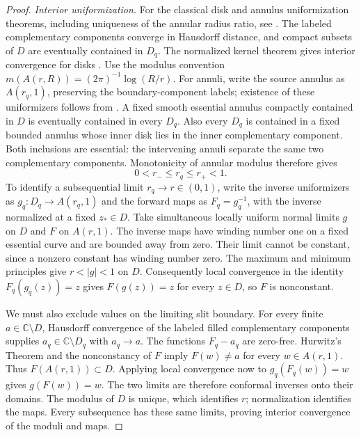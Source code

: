\documentclass[11pt]{article}
\theoremstyle{definition}
\theoremstyle{remark}
\numberwithin{equation}{section}
\begin{document}
\begin{proof}
\emph{Interior uniformization.}
For the classical disk and annulus uniformization theorems, including
uniqueness of the annular radius ratio, see
\cite[Theorems~1.2.1 and~1.3.1]{Papamichael2008}.
The labeled complementary components converge in Hausdorff distance,
and compact subsets of $D$ are eventually contained in $D_q$.
The normalized kernel theorem gives interior convergence for disks
\cite[Definition~2.8 and Theorem~2.9]{CarmonaFedorovskiy2024}.
Use the modulus convention $m(A(r,R))=(2\pi)^{-1}\log(R/r)$.
For annuli, write the source annulus as $A(r_q,1)$, preserving the
boundary-component labels; existence of these uniformizers follows
from \cite[Theorem~1.3.1]{Papamichael2008}. A fixed smooth essential annulus compactly
contained in $D$ is eventually contained in every $D_q$.  Also every
$D_q$ is contained in a fixed bounded annulus whose inner disk lies in
the inner complementary component. Both inclusions are essential:
the intervening annuli separate the same two complementary components.
Monotonicity of annular modulus
\cite[Proposition~4.3.5 and Section~4.3.4]{Beliaev2015}
therefore gives
\[
                 0<r_-\le r_q\le r_+<1.
\]
To identify a subsequential limit $r_q\to r\in(0,1)$, write the inverse
uniformizers as $g_q:D_q\to A(r_q,1)$ and the forward maps as
$F_q=g_q^{-1}$, with the inverse normalized at a fixed $z_*\in D$.
Take simultaneous locally uniform normal limits $g$ on $D$ and $F$
on $A(r,1)$.  The inverse maps have winding number one on a fixed
essential curve and are bounded away from zero.  Their limit cannot
be constant, since a nonzero constant has winding number zero.
The maximum and minimum principles give $r<|g|<1$ on $D$.
Consequently local convergence in the identity
$F_q(g_q(z))=z$ gives $F(g(z))=z$ for every $z\in D$, so $F$ is
nonconstant.

We must also exclude values on the limiting slit boundary.  For every
finite $a\in\mathbb C\setminus D$, Hausdorff convergence of the
labeled filled complementary components supplies
$a_q\in\mathbb C\setminus D_q$ with $a_q\to a$.
The functions $F_q-a_q$ are zero-free.  Hurwitz's Theorem and the
nonconstancy of $F$ imply $F(w)\ne a$ for every $w\in A(r,1)$.
Thus $F(A(r,1))\subset D$.  Applying local convergence now to
$g_q(F_q(w))=w$ gives $g(F(w))=w$.  The two limits are therefore
conformal inverses onto their domains.  The modulus of $D$ is unique,
which identifies $r$; normalization identifies the maps.  Every
subsequence has these same limits, proving interior convergence of
the moduli and maps.


\end{proof}
\end{document}
